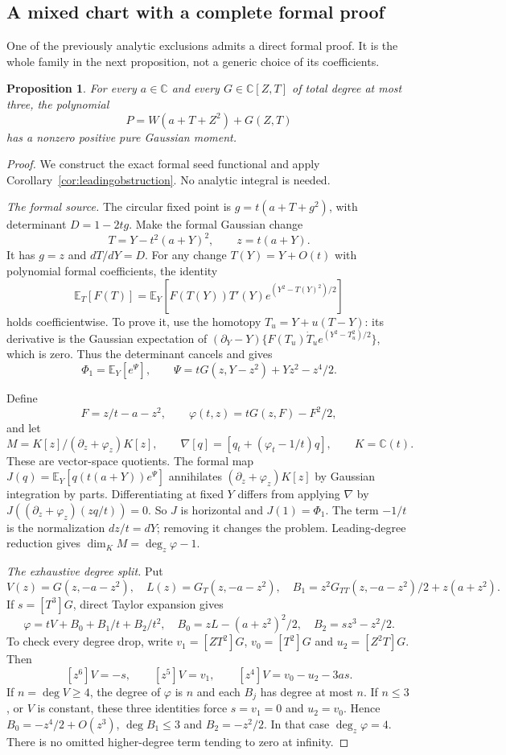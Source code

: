 \documentclass[11pt]{article}
\newtheorem{proposition}[theorem]{Proposition}
\theoremstyle{definition}\newtheorem{definition}[theorem]{Definition}
\theoremstyle{remark}\newtheorem{remark}[theorem]{Remark}
\newcommand{\E}{\mathbb E}
\newcommand{\C}{\mathbb C}
\begin{document}
\subsection{A mixed chart with a complete formal proof}\label{sec:mixedformal}

One of the previously analytic exclusions admits a direct formal proof.
It is the whole family in the next proposition, not a generic choice
of its coefficients.

\begin{proposition}\label{prop:mixedformal}
For every $a\in\C$ and every $G\in\C[Z,T]$ of total degree at most
three, the polynomial
\[
 P=W(a+T+Z^2)+G(Z,T)
\]
has a nonzero positive pure Gaussian moment.
\end{proposition}
\begin{proof}
We construct the exact formal seed functional and apply
Corollary~\ref{cor:leadingobstruction}. No analytic integral is needed.

\emph{The formal source.}
The circular fixed point is $g=t(a+T+g^2)$, with determinant
$D=1-2tg$. Make the formal Gaussian change
\[
 T=Y-t^2(a+Y)^2,\qquad z=t(a+Y).
\]
It has $g=z$ and $dT/dY=D$. For any change $T(Y)=Y+O(t)$ with
polynomial formal coefficients, the identity
\[
 \E_T[F(T)]=\E_Y\!\left[F(T(Y))T'(Y)
             e^{(Y^2-T(Y)^2)/2}\right]
\]
holds coefficientwise. To prove it, use the homotopy
$T_u=Y+u(T-Y)$: its derivative is the Gaussian expectation of
$(\partial_Y-Y)\{F(T_u)\dot T_u e^{(Y^2-T_u^2)/2}\}$, which is zero.
Thus the determinant cancels and gives
\[
 \Phi_1=\E_Y[e^\Psi],\qquad
 \Psi=tG(z,Y-z^2)+Yz^2-z^4/2.
\]

Define
\[
 F=z/t-a-z^2,\qquad \varphi(t,z)=tG(z,F)-F^2/2,
\]
and let
\[
 M=K[z]/(\partial_z+\varphi_z)K[z],\qquad
 \nabla[q]=[q_t+(\varphi_t-1/t)q],\qquad K=\C(t).
\]
These are vector-space quotients. The formal map
$J(q)=\E_Y[q(t(a+Y))e^\Psi]$ annihilates
$(\partial_z+\varphi_z)K[z]$ by Gaussian integration by parts.
Differentiating at fixed $Y$ differs from applying $\nabla$ by
$J((\partial_z+\varphi_z)(zq/t))=0$.
So $J$ is horizontal and $J(1)=\Phi_1$. The term $-1/t$ is the
normalization $dz/t=dY$; removing it changes the problem.
Leading-degree reduction gives $\dim_K M=\deg_z\varphi-1$.

\emph{The exhaustive degree split.}
Put
\[
 V(z)=G(z,-a-z^2),\quad L(z)=G_T(z,-a-z^2),\quad
 B_1=z^2G_{TT}(z,-a-z^2)/2+z(a+z^2).
\]
If $s=[T^3]G$, direct Taylor expansion gives
\begin{equation}\label{eq:mixedphi}
 \varphi=tV+B_0+B_1/t+B_2/t^2,
 \quad B_0=zL-(a+z^2)^2/2,\quad B_2=sz^3-z^2/2.
\end{equation}
To check every degree drop, write $v_1=[ZT^2]G$,
$v_0=[T^2]G$ and $u_2=[Z^2T]G$. Then
\[
 [z^6]V=-s,\qquad [z^5]V=v_1,\qquad
 [z^4]V=v_0-u_2-3as.
\]
If $n=\deg V\geq4$, the degree of $\varphi$ is $n$ and each $B_j$
has degree at most $n$. If $n\leq3$, or $V$ is constant, these three
identities force $s=v_1=0$ and $u_2=v_0$. Hence
$B_0=-z^4/2+O(z^3)$, $\deg B_1\leq3$ and $B_2=-z^2/2$.
In that case $\deg_z\varphi=4$. There is no omitted higher-degree
term tending to zero at infinity.


\end{proof}
\end{document}
